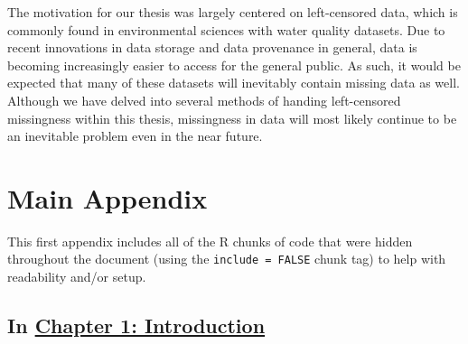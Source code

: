 \documentclass[12pt, twoside]{amherstthesis}
\begin{document}
The motivation for our thesis was largely centered on left-censored data, which is commonly found in environmental sciences with water quality datasets. Due to recent innovations in data storage and data provenance in general, data is becoming increasingly easier to access for the general public. As such, it would be expected that many of these datasets will inevitably contain missing data as well. Although we have delved into several methods of handing left-censored missingness within this thesis, missingness in data will most likely continue to be an inevitable problem even in the near future.

\appendix

\hypertarget{main-appendix}{%
\chapter{Main Appendix}\label{main-appendix}}

This first appendix includes all of the R chunks of code that were hidden throughout the document (using the \texttt{include\ =\ FALSE} chunk tag) to help with readability and/or setup.

\hypertarget{in-chapter-1-introduction}{%
\section{\texorpdfstring{In \protect\hyperlink{intro}{Chapter 1: Introduction}}{In Chapter 1: Introduction}}\label{in-chapter-1-introduction}}
\end{document}
